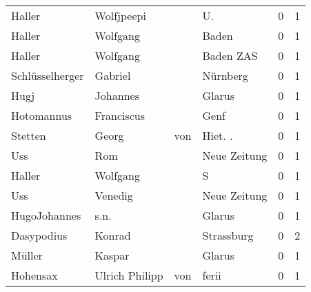 \begin{center}
\begin{tiny}
\begin{longtabu}{llllrr}
                   Haller &                         Wolfjpeepi &             &                                         U.  &          0 &         1 \\
                   Haller &                           Wolfgang &             &                                       Baden &          0 &         1 \\
                   Haller &                           Wolfgang &             &                                   Baden ZAS &          0 &         1 \\
          Schlüsselherger &                            Gabriel &             &                                    Nürnberg &          0 &         1 \\
                     Hugj &                           Johannes &             &                                      Glarus &          0 &         1 \\
               Hotomannus &                         Franciscus &             &                                        Genf &          0 &         1 \\
                  Stetten &                              Georg &         von &                                    Hiet. .  &          0 &         1 \\
                      Uss &                                Rom &             &                                Neue Zeitung &          0 &         1 \\
                   Haller &                           Wolfgang &             &                                           S &          0 &         1 \\
                      Uss &                            Venedig &             &                                Neue Zeitung &          0 &         1 \\
             HugoJohannes &                               s.n. &             &                                      Glarus &          0 &         1 \\
               Dasypodius &                             Konrad &             &                                  Strassburg &          0 &         2 \\
                   Müller &                             Kaspar &             &                                      Glarus &          0 &         1 \\
                 Hohensax &                     Ulrich Philipp &         von &                                       ferii &          0 &         1 \\

\end{longtabu}
\end{tiny}
\end{center}
